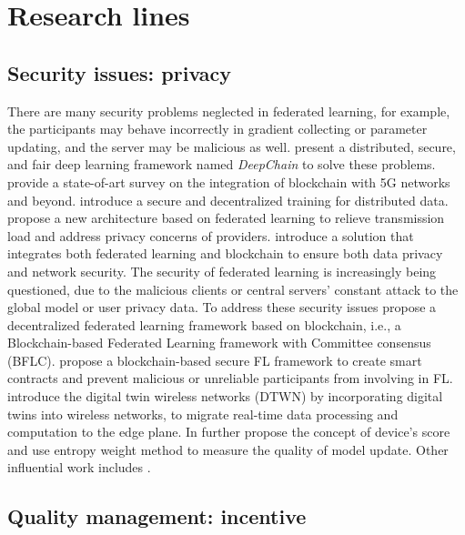 \documentclass{article}
\begin{document}
\section{Research lines}

\subsection{Security issues: privacy}

There are many security problems neglected in federated learning, for example, the participants may behave incorrectly in gradient collecting or parameter updating, and the server may be malicious as well. \cite{weng_2019} present a distributed, secure, and fair deep learning framework named \textit{DeepChain} to solve these problems. \cite{nguyen_2020} provide a state-of-art survey on the integration of blockchain with 5G networks and beyond. \cite{kumar_2020} introduce a secure and decentralized training for distributed data. \cite{zhang_2020} propose a new architecture based on federated learning to relieve transmission load and address privacy concerns of providers. \cite{otoum_2020} introduce a solution that integrates both federated learning and blockchain to ensure both data privacy and network security. The security of federated learning is increasingly being questioned, due to the malicious clients or central servers' constant attack to the global model or user privacy data. To address these security issues \cite{li_2021} propose a decentralized federated learning framework based on blockchain, i.e., a Blockchain-based Federated Learning framework with Committee consensus (BFLC). \cite{liu_2020} propose a blockchain-based secure FL framework to create smart contracts and prevent malicious or unreliable participants from involving in FL. \cite{9170905} introduce the digital twin wireless networks (DTWN) by incorporating digital twins into wireless networks, to migrate real-time data processing and computation to the edge plane. In further \cite{xu_bafl_2021} propose the concept of device's score and use entropy weight method to measure the quality of model update. Other influential work includes \cite{lu_2020}.

\subsection{Quality management: incentive}
\end{document}
